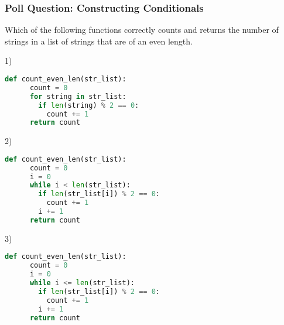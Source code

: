\documentclass{beamer}
\begin{document}
%
%
\begin{frame}[fragile]
	\frametitle{Poll Question: Constructing Conditionals}
  Which of the following functions correctly counts and returns the number of strings in a list of strings that are of an even length.
	\vfill
	\begin{minipage}{0.49\textwidth}
    1)
		\begin{lstlisting}[language=Python, autogobble,basicstyle=\tiny,numbers=none]
    def count_even_len(str_list):
      count = 0 
      for string in str_list:
        if len(string) % 2 == 0:
          count += 1
      return count
		\end{lstlisting}
	\end{minipage}
	\begin{minipage}{0.49\textwidth}
    2)
		\begin{lstlisting}[language=Python, autogobble,basicstyle=\tiny,numbers=none]
    def count_even_len(str_list):
      count = 0 
      i = 0
      while i < len(str_list):
        if len(str_list[i]) % 2 == 0:
          count += 1
        i += 1
      return count
		\end{lstlisting}
	\end{minipage}
  \vfill
  \centering
  \begin{minipage}{0.45\textwidth}
    3)
    \begin{lstlisting}[language=Python, autogobble,basicstyle=\tiny,numbers=none]
    def count_even_len(str_list):
      count = 0 
      i = 0
      while i <= len(str_list):
        if len(str_list[i]) % 2 == 0:
          count += 1
        i += 1
      return count
    \end{lstlisting}
  \end{minipage}
\end{frame}
\end{document}
